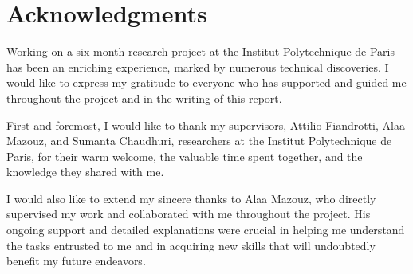 \chapter*{Acknowledgments}
Working on a six-month research project at the Institut Polytechnique de Paris has been an enriching experience, marked by numerous technical discoveries. I would like to express my gratitude to everyone who has supported and guided me throughout the project and in the writing of this report.

First and foremost, I would like to thank my supervisors, Attilio Fiandrotti, Alaa Mazouz, and Sumanta Chaudhuri, researchers at the Institut Polytechnique de Paris, for their warm welcome, the valuable time spent together, and the knowledge they shared with me.

I would also like to extend my sincere thanks to Alaa Mazouz, who directly supervised my work and collaborated with me throughout the project. His ongoing support and detailed explanations were crucial in helping me understand the tasks entrusted to me and in acquiring new skills that will undoubtedly benefit my future endeavors.